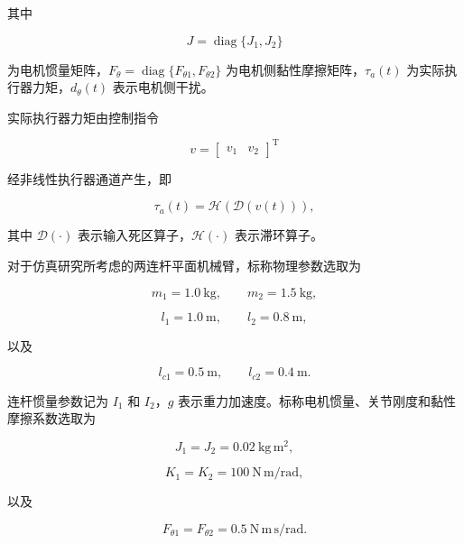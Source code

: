 \documentclass{article}
\begin{document}
其中

\begin{equation*}
J=\operatorname{diag}\{J_1,J_2\}
\end{equation*}

为电机惯量矩阵，$F_\theta=\operatorname{diag}\{F_{\theta 1},F_{\theta 2}\}$ 为电机侧黏性摩擦矩阵，$\tau_a(t)$ 为实际执行器力矩，$d_\theta(t)$ 表示电机侧干扰。

实际执行器力矩由控制指令

\begin{equation*}
v=\begin{bmatrix}v_1 & v_2\end{bmatrix}^{\mathrm T}
\end{equation*}

经非线性执行器通道产生，即

\begin{equation}
\tau_a(t)=\mathcal{H}\!\left(\mathcal{D}(v(t))\right), \tag{3}
\end{equation}

其中 $\mathcal{D}(\cdot)$ 表示输入死区算子，$\mathcal{H}(\cdot)$ 表示滞环算子。

对于仿真研究所考虑的两连杆平面机械臂，标称物理参数选取为

\begin{equation*}
m_1=1.0~\mathrm{kg},\qquad m_2=1.5~\mathrm{kg},
\end{equation*}

\begin{equation*}
l_1=1.0~\mathrm{m},\qquad l_2=0.8~\mathrm{m},
\end{equation*}

以及

\begin{equation*}
l_{c1}=0.5~\mathrm{m},\qquad l_{c2}=0.4~\mathrm{m}.
\end{equation*}

连杆惯量参数记为 $I_1$ 和 $I_2$，$g$ 表示重力加速度。标称电机惯量、关节刚度和黏性摩擦系数选取为

\begin{equation*}
J_1=J_2=0.02~\mathrm{kg\,m^2},
\end{equation*}

\begin{equation*}
K_1=K_2=100~\mathrm{N\,m/rad},
\end{equation*}

以及

\begin{equation*}
F_{\theta 1}=F_{\theta 2}=0.5~\mathrm{N\,m\,s/rad}.
\end{equation*}
\end{document}
